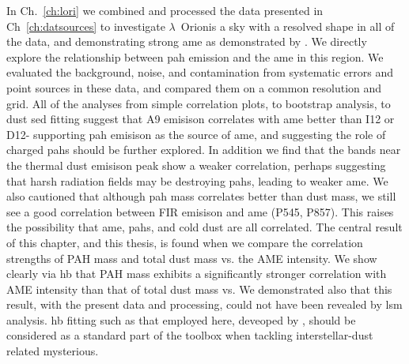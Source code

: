   In Ch.~\ref{ch:lori} we combined and processed the data presented in Ch~\ref{ch:datsources} to investigate $\lambda$~Orionis a sky with a resolved shape in all of the data, and demonstrating strong \acrshort{ame} as demonstrated by \cite{planck15}. We directly explore the relationship between \acrshort{pah} emission and the \acrshort{ame} in this region.  We evaluated the background, noise, and contamination from systematic errors and point sources in these data, and compared them on a common resolution and grid. All of the analyses from simple correlation plots, to bootstrap analysis, to dust \acrshort{sed} fitting suggest that A9 emisison correlates with \acrshort{ame} better than I12 or D12- supporting \acrshort{pah} emisison as the source of \acrshort{ame}, and suggesting the role of charged \acrshort{pah}s should be further explored. In addition we find that the bands near the thermal dust emisison peak show a weaker correlation, perhaps suggesting that harsh radiation fields may be destroying \acrshort{pah}s, leading to weaker \acrshort{ame}. We also cautioned that although \acrshort{pah} mass correlates better than dust mass, we still see a good correlation between FIR emisison and \acrshort{ame} (P545, P857). This raises the possibility that \acrshort{ame}, \acrshort{pah}s, and cold dust are all correlated. The central result of this chapter, and this thesis, is found when we compare the correlation strengths of PAH mass and total dust mass vs. the AME intensity. We show clearly via \acrshort{hb} that PAH mass exhibits a significantly stronger correlation with AME intensity than that of total dust mass vs. We demonstrated also that this result, with the present data and processing, could not have been revealed by \acrshort{lsm} analysis. \acrshort{hb} fitting such as that employed here, deveoped by \cite{galliano18}, should be considered as a standard part of the toolbox when tackling interstellar-dust related mysterious.

